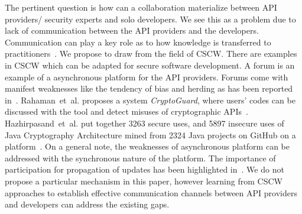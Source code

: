\documentclass[conference]{IEEEtran}
\newcommand{\etal}[0]{et~al{.}}
\begin{document}
The pertinent question is how can a collaboration materialize between API providers/ security experts and solo developers. We see this as a problem due to lack of communication between the API providers and the developers. Communication can play a key role as to how knowledge is transferred to practitioners~\cite{claeys2019}. We propose to draw from the field of \ac{CSCW}. There are examples in \ac{CSCW} which can be adapted for secure software development. A forum is an example of a asynchronous platform for the API providers. Forums come with manifest weaknesses like the tendency of bias and herding as has been reported in~\cite{emmasurface2020}. Rahaman~\etal{} proposes a system \emph{CryptoGuard}, where users' codes can be discussed with the tool and detect misuses of cryptographic APIs~\cite{rahaman2018tutorial}. Hazhirpasand~\etal{} put together 3263 secure uses, and 5897 insecure uses of Java Cryptography Architecture mined from 2324 Java projects on GitHub on a platform~\cite{hazhirpasand2020}. On a general note, the weaknesses of asynchronous platform can be addressed with the synchronous nature of the platform. The importance of participation for propagation of updates has been highlighted in~\cite{erikacar2017}. We do not propose a particular mechanism in this paper, however learning from \ac{CSCW} approaches to establish effective communication channels between API providers and developers can address the existing gaps.   
 

\balance


\end{document}
